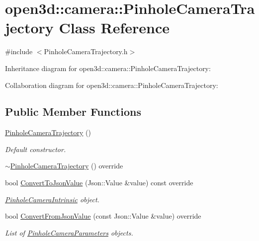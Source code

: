 \hypertarget{classopen3d_1_1camera_1_1_pinhole_camera_trajectory}{}\section{open3d\+::camera\+::Pinhole\+Camera\+Trajectory Class Reference}
\label{classopen3d_1_1camera_1_1_pinhole_camera_trajectory}


{\ttfamily \#include $<$Pinhole\+Camera\+Trajectory.\+h$>$}



Inheritance diagram for open3d\+::camera\+::Pinhole\+Camera\+Trajectory\+:


Collaboration diagram for open3d\+::camera\+::Pinhole\+Camera\+Trajectory\+:
\subsection*{Public Member Functions}
\begin{DoxyCompactItemize}
\item 
\mbox{\hyperlink{classopen3d_1_1camera_1_1_pinhole_camera_trajectory_a10142b8ed17053267fb537a792b8a63c}{Pinhole\+Camera\+Trajectory}} ()
\begin{DoxyCompactList}\small\item\em Default constructor. \end{DoxyCompactList}\item 
\mbox{\hyperlink{classopen3d_1_1camera_1_1_pinhole_camera_trajectory_a345ace8fadf3ea020bf9002db8e539af}{$\sim$\+Pinhole\+Camera\+Trajectory}} () override
\item 
bool \mbox{\hyperlink{classopen3d_1_1camera_1_1_pinhole_camera_trajectory_af54b7e957f918c9d577ef5d93acbcde3}{Convert\+To\+Json\+Value}} (Json\+::\+Value \&value) const override
\begin{DoxyCompactList}\small\item\em \mbox{\hyperlink{classopen3d_1_1camera_1_1_pinhole_camera_intrinsic}{Pinhole\+Camera\+Intrinsic}} object. \end{DoxyCompactList}\item 
bool \mbox{\hyperlink{classopen3d_1_1camera_1_1_pinhole_camera_trajectory_ad1cecdbbb56375e5b67ea1acc02c21d8}{Convert\+From\+Json\+Value}} (const Json\+::\+Value \&value) override
\begin{DoxyCompactList}\small\item\em List of \mbox{\hyperlink{classopen3d_1_1camera_1_1_pinhole_camera_parameters}{Pinhole\+Camera\+Parameters}} objects. \end{DoxyCompactList}\end{DoxyCompactItemize}
